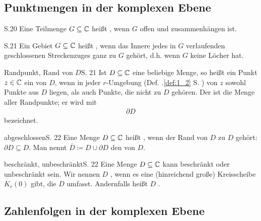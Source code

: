 \subsection{Punktmengen in der komplexen Ebene}

\begin{definition}[Gebiet]{S.20}
  Eine Teilmenge $G \subseteq \mathbb{C}$ heißt , wenn $G$ offen und zusammenhängen ist.
\end{definition}

\begin{definition}{S.21}
  Ein Gebiet $G \subseteq \mathbb{C}$ heißt , wenn das Innere jedes in $G$ verlaufenden geschlossenen Streckenzuges ganz zu $G$ gehört, d.h. wenn $G$ keine Löcher hat.
\end{definition}

\begin{bemerkung}{Randpunkt, Rand von $D$}{S. 21}
  Ist $D \subseteq \mathbb{C}$ eine beliebige Menge, so heißt ein Punkt $z \in \mathbb{C}$ ein  von $D$, wenn in jeder $r$-Umgebung (Def. .\ref{def:1_2} S. \pageref{def:1_2}) von $z$ sowohl Punkte aus $D$ liegen, als auch Punkte, die nicht zu $D$ gehören.
  Der  ist die Menge aller Randpunkte; er wird mit
  \begin{align}
    \partial D
  \end{align}
  bezeichnet.
\end{bemerkung}

\begin{bemerkung}{abgeschlossen}{S. 22}
  Eine Menge $D \subseteq \mathbb{C}$ heißt , wenn der Rand von $D$ zu $D$ gehört: $\partial D \subseteq D$.
  Man nennt $\overline{D} \coloneqq D \cup \partial D$ den  von $D$.
\end{bemerkung}

\begin{bemerkung}{beschränkt, unbeschränkt}{S. 22}
  Eine Menge $D \subseteq \mathbb{C}$ kann beschränkt oder unbeschränkt sein.
  Wir nennen $D$ , wenn es eine (hinreichend große) Kreisscheibe $K_r(0)$ gibt, die $D$ umfasst.
  Andernfalls heißt $D$ .
\end{bemerkung}



\subsection{Zahlenfolgen in der komplexen Ebene}

